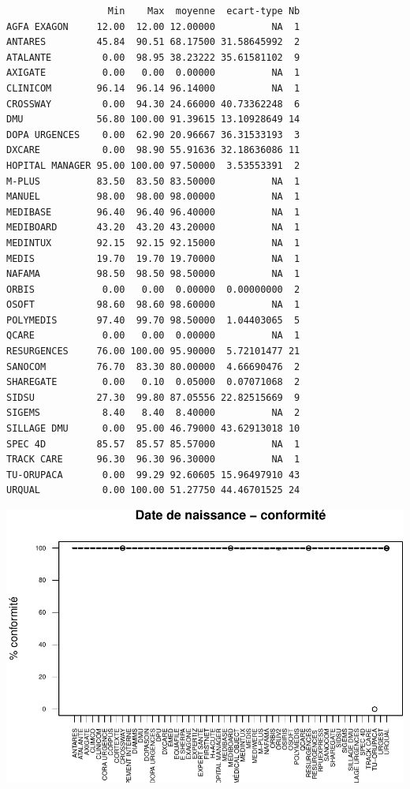 \documentclass[]{article}
\begin{document}
\begin{verbatim}
                  Min    Max  moyenne  ecart-type Nb
AGFA EXAGON     12.00  12.00 12.00000          NA  1
ANTARES         45.84  90.51 68.17500 31.58645992  2
ATALANTE         0.00  98.95 38.23222 35.61581102  9
AXIGATE          0.00   0.00  0.00000          NA  1
CLINICOM        96.14  96.14 96.14000          NA  1
CROSSWAY         0.00  94.30 24.66000 40.73362248  6
DMU             56.80 100.00 91.39615 13.10928649 14
DOPA URGENCES    0.00  62.90 20.96667 36.31533193  3
DXCARE           0.00  98.90 55.91636 32.18636086 11
HOPITAL MANAGER 95.00 100.00 97.50000  3.53553391  2
M-PLUS          83.50  83.50 83.50000          NA  1
MANUEL          98.00  98.00 98.00000          NA  1
MEDIBASE        96.40  96.40 96.40000          NA  1
MEDIBOARD       43.20  43.20 43.20000          NA  1
MEDINTUX        92.15  92.15 92.15000          NA  1
MEDIS           19.70  19.70 19.70000          NA  1
NAFAMA          98.50  98.50 98.50000          NA  1
ORBIS            0.00   0.00  0.00000  0.00000000  2
OSOFT           98.60  98.60 98.60000          NA  1
POLYMEDIS       97.40  99.70 98.50000  1.04403065  5
QCARE            0.00   0.00  0.00000          NA  1
RESURGENCES     76.00 100.00 95.90000  5.72101477 21
SANOCOM         76.70  83.30 80.00000  4.66690476  2
SHAREGATE        0.00   0.10  0.05000  0.07071068  2
SIDSU           27.30  99.80 87.05556 22.82515669  9
SIGEMS           8.40   8.40  8.40000          NA  2
SILLAGE DMU      0.00  95.00 46.79000 43.62913018 10
SPEC 4D         85.57  85.57 85.57000          NA  1
TRACK CARE      96.30  96.30 96.30000          NA  1
TU-ORUPACA       0.00  99.29 92.60605 15.96497910 43
URQUAL           0.00 100.00 51.27750 44.46701525 24
\end{verbatim}

\includegraphics{septembre2015_files/figure-latex/unnamed-chunk-17-1.pdf}
\end{document}
